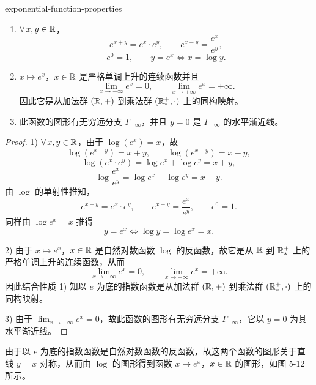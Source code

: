 \begin{mythm}{}{exponential-function-properties}

	\begin{enumerate}[label=\arabic*)]
		\item \(\forall\,x,y\in\mathbb{R}\)，
		\[
		e^{x+y}=e^x\cdot e^y,\qquad e^{x-y}=\frac{e^x}{e^y},
		\]
		\[
		e^0=1,\qquad y=e^x\Longleftrightarrow x=\log y.
		\]

		\item \(x\longmapsto e^x\)，\(x\in\mathbb{R}\) 是严格单调上升的连续函数并且
		\[
		\lim_{x\to-\infty}e^x=0,\qquad\lim_{x\to+\infty}e^x=+\infty.
		\]
		因此它是从加法群 \((\mathbb{R},+)\) 到乘法群 \((\mathbb{R}_*^+,\cdot)\) 上的同构映射。

		\item 此函数的图形有无穷远分支 \(\Gamma_{-\infty}\)，并且 \(y=0\) 是 \(\Gamma_{-\infty}\) 的水平渐近线。
	\end{enumerate}

\end{mythm}

\begin{proof}

	1) \(\forall\,x,y\in\mathbb{R}\)，由于 \(\log(e^x)=x\)，故
	\[
	\log(e^{x+y})=x+y,\qquad\log(e^{x-y})=x-y,
	\]
	\[
	\log(e^x\cdot e^y)=\log e^x+\log e^y=x+y,
	\]
	\[
	\log\frac{e^x}{e^y}=\log e^x-\log e^y=x-y.
	\]
	由 \(\log\) 的单射性推知，
	\[
	e^{x+y}=e^x\cdot e^y,\qquad e^{x-y}=\frac{e^x}{e^y},\qquad e^0=1.
	\]
	同样由 \(\log e^x=x\) 推得
	\[
	y=e^x\Longleftrightarrow\log y=\log e^x=x.
	\]

	2) 由于 \(x\longmapsto e^x\)，\(x\in\mathbb{R}\) 是自然对数函数 \(\log\) 的反函数，故它是从 \(\mathbb{R}\) 到 \(\mathbb{R}_*^+\) 上的严格单调上升的连续函数，从而
	\[
	\lim_{x\to-\infty}e^x=0,\qquad\lim_{x\to+\infty}e^x=+\infty.
	\]
	因此结合性质 1) 知以 \(e\) 为底的指数函数是从加法群 \((\mathbb{R},+)\) 到乘法群 \((\mathbb{R}_*^+,\cdot)\) 上的同构映射。

	3) 由于 \(\lim_{x\to-\infty}e^x=0\)，故此函数的图形有无穷远分支 \(\Gamma_{-\infty}\)，它以 \(y=0\) 为其水平渐近线。

\end{proof}

由于以 \(e\) 为底的指数函数是自然对数函数的反函数，故这两个函数的图形关于直线 \(y=x\) 对称，从而由 \(\log\) 的图形得到函数 \(x\longmapsto e^x\)，\(x\in\mathbb{R}\) 的图形，如图 5-12 所示。

\begin{figure}[htbp]
	\centering
	\caption{}
	\label{fig:5-12}
\end{figure}

